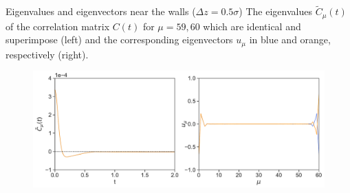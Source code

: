 \documentclass{beamer}
\begin{document}
\begin{frame}{Eigenvalues and eigenvectors near the walls ($\Delta z=0.5\sigma$)}
    The eigenvalues $\tilde{C}_{\mu}(t)$ of the correlation matrix $C(t)$ for $\mu=59,60$ which are identical and superimpose (left) and the corresponding eigenvectors $u_{\mu}$ in blue and orange, respectively (right).
  \begin{figure}[h!]
\includegraphics[width=0.5\linewidth]{EigenvaluesVectors-WALLS-66nodes}
\end{figure}
\end{frame}
\end{document}
